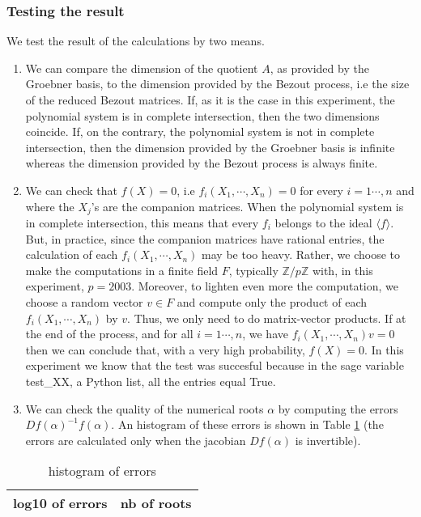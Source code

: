\documentclass{standalone}
\begin{document}
\subsubsection{Testing the result}
\label{testing_the_result}
We test the result of the calculations by two means. 
\begin{enumerate}
\item
We can compare the dimension of the quotient $A$, as provided by the Groebner basis, to the dimension provided by the Bezout process, i.e the size of the reduced Bezout matrices. If, as it is the case in this experiment, the polynomial system is in complete intersection, then the two dimensions coincide. If, on the contrary, the polynomial system is not in complete intersection, then the dimension provided by the Groebner basis is infinite whereas the dimension provided by the Bezout process is always finite.
\item
We can check that $f(X) = 0$, i.e $f_i(X_1,\cdots, X_n) = 0$ for every $i = 1\cdots, n$ and where the $X_j$'s are the companion matrices. When the polynomial system is in complete intersection, this means that every $f_i$ belongs to the ideal $\langle f\rangle$. But, in practice, since the companion matrices have rational entries, the calculation of each $f_i(X_1,\cdots, X_n)$ may be too heavy. Rather, we choose to make the computations in a finite field $F$, typically $\mathbb{Z}/ p\mathbb{Z}$ with, in this experiment, $p = 2003$. Moreover, to lighten even more the computation, we choose a random vector $v\in F$ and compute only the product of each $f_i(X_1,\cdots, X_n)$ by $v$. Thus, we only need to do matrix-vector products. If at the end of the process, and for all $i= 1\cdots, n$, we have $f_i(X_1,\cdots, X_n)v = 0$ then we can conclude that, with a very high probability, $f(X) = 0$. In this experiment we know that the test was succesful because in the sage variable test\_XX, a Python list, all the entries equal True.
\item
We can check the quality of the numerical roots $\alpha$ by computing the errors $Df(\alpha)^{-1}f(\alpha)$. An histogram of these errors is shown in Table \ref{tab:histo} (the errors are calculated only when the jacobian $Df(\alpha)$ is invertible).
\end{enumerate}

\begin{table}[h]
\begin{center}
\begin{tabular}{c|c}
 log10 of errors & nb of roots \\ 
 \hline
 
\end{tabular}
\end{center}
\caption{histogram of errors}
\label{tab:histo}
\end{table}
\end{document}
